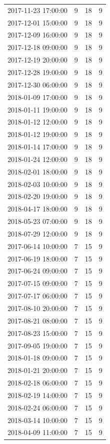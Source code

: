 \begin{tabular}{lrrr}
2017-11-23 17:00:00 & 9 & 18 & 9 \\
2017-12-01 15:00:00 & 9 & 18 & 9 \\
2017-12-09 16:00:00 & 9 & 18 & 9 \\
2017-12-18 09:00:00 & 9 & 18 & 9 \\
2017-12-19 20:00:00 & 9 & 18 & 9 \\
2017-12-28 19:00:00 & 9 & 18 & 9 \\
2017-12-30 06:00:00 & 9 & 18 & 9 \\
2018-01-09 17:00:00 & 9 & 18 & 9 \\
2018-01-11 19:00:00 & 9 & 18 & 9 \\
2018-01-12 12:00:00 & 9 & 18 & 9 \\
2018-01-12 19:00:00 & 9 & 18 & 9 \\
2018-01-14 17:00:00 & 9 & 18 & 9 \\
2018-01-24 12:00:00 & 9 & 18 & 9 \\
2018-02-01 18:00:00 & 9 & 18 & 9 \\
2018-02-03 10:00:00 & 9 & 18 & 9 \\
2018-02-20 19:00:00 & 9 & 18 & 9 \\
2018-04-17 18:00:00 & 9 & 18 & 9 \\
2018-05-23 07:00:00 & 9 & 18 & 9 \\
2018-07-29 12:00:00 & 9 & 18 & 9 \\
2017-06-14 10:00:00 & 7 & 15 & 9 \\
2017-06-19 18:00:00 & 7 & 15 & 9 \\
2017-06-24 09:00:00 & 7 & 15 & 9 \\
2017-07-15 09:00:00 & 7 & 15 & 9 \\
2017-07-17 06:00:00 & 7 & 15 & 9 \\
2017-08-10 20:00:00 & 7 & 15 & 9 \\
2017-08-21 08:00:00 & 7 & 15 & 9 \\
2017-08-23 15:00:00 & 7 & 15 & 9 \\
2017-09-05 19:00:00 & 7 & 15 & 9 \\
2018-01-18 09:00:00 & 7 & 15 & 9 \\
2018-01-21 20:00:00 & 7 & 15 & 9 \\
2018-02-18 06:00:00 & 7 & 15 & 9 \\
2018-02-19 14:00:00 & 7 & 15 & 9 \\
2018-02-24 06:00:00 & 7 & 15 & 9 \\
2018-03-14 10:00:00 & 7 & 15 & 9 \\
2018-04-09 11:00:00 & 7 & 15 & 9 \\

\end{tabular}
